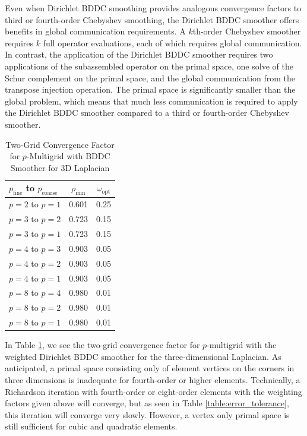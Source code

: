 Even when Dirichlet BDDC smoothing provides analogous convergence factors to third or fourth-order Chebyshev smoothing, the Dirichlet BDDC smoother offers benefits in global communication requirements.
A $k$th-order Chebyshev smoother requires $k$ full operator evaluations, each of which requires global communication.
In contrast, the application of the Dirichlet BDDC smoother requires two applications of the subassembled operator on the primal space, one solve of the Schur complement on the primal space, and the global communication from the transpose injection operation.
The primal space is significantly smaller than the global problem, which means that much less communication is required to apply the Dirichlet BDDC smoother compared to a third or fourth-order Chebyshev smoother.

\begin{table}[ht!]
\begin{center}
\begin{tabular}{l cc}
  \toprule
  $p_{\text{fine}}$ to $p_{\text{coarse}}$  & $\rho_{\min}$ & $\omega_{\text{opt}}$  \\
  \toprule
  $p = 2$ to $p = 1$   &  0.601 & 0.25  \\
  \midrule
  $p = 3$ to $p = 2$   &  0.723 & 0.15  \\
  $p = 3$ to $p = 1$   &  0.723 & 0.15  \\
  \midrule
  $p = 4$ to $p = 3$   &  0.903 & 0.05  \\
  $p = 4$ to $p = 2$   &  0.903 & 0.05  \\
  $p = 4$ to $p = 1$   &  0.903 & 0.05  \\
  \midrule
  $p = 8$ to $p = 4$   &  0.980 & 0.01  \\
  $p = 8$ to $p = 2$   &  0.980 & 0.01  \\
  $p = 8$ to $p = 1$   &  0.980 & 0.01  \\
  \bottomrule
\end{tabular}
\end{center}
\caption{Two-Grid Convergence Factor for $p$-Multigrid with BDDC Smoother for 3D Laplacian}
\label{table:two_grid_bddc_smoother_3d}
\end{table}

In Table \ref{table:two_grid_bddc_smoother_3d}, we see the two-grid convergence factor for $p$-multigrid with the weighted Dirichlet BDDC smoother for the three-dimensional Laplacian.
As anticipated, a primal space consisting only of element vertices on the corners in three dimensions is inadequate for fourth-order or higher elements.
Technically, a Richardson iteration with fourth-order or eight-order elements with the weighting factors given above will converge, but as seen in Table \ref{table:error_tolerance}, this iteration will converge very slowly.
However, a vertex only primal space is still sufficient for cubic and quadratic elements.

